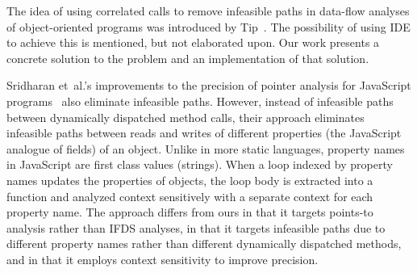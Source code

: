
The idea of using correlated calls to remove infeasible paths in data-flow analyses of object-oriented programs was introduced by Tip~\cite{DBLP:journals/scp/Tip15}. The possibility of using IDE to achieve this is mentioned, but not elaborated upon. Our work presents a concrete solution to the problem and an implementation of that solution.

Sridharan et~al.'s improvements to the precision of pointer analysis
for Ja\-va\-Script programs~\cite{DBLP:conf/ecoop/SridharanDCST12} also
eliminate infeasible paths. However, instead of infeasible paths
between dynamically dispatched method calls, their approach eliminates
infeasible paths between reads and writes of different properties
(the JavaScript analogue of fields) of an object. Unlike in more static languages,
property names in JavaScript are first class values (strings). When a loop indexed by
property names updates the properties of objects, the loop body is extracted into a function
and analyzed context sensitively with a separate context for each property name.
The approach differs from ours in that it targets points-to analysis rather
than IFDS analyses, in that it targets infeasible paths due to different
property names rather than different dynamically dispatched methods,
and in that it employs context sensitivity to improve precision.


